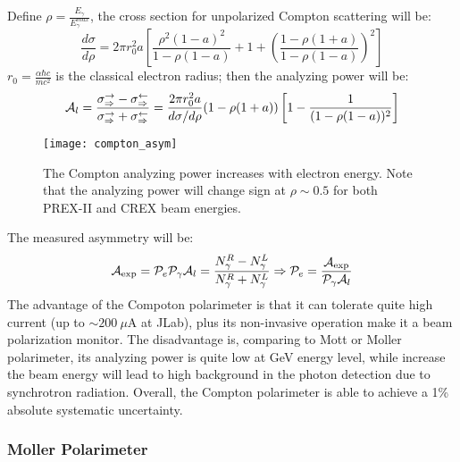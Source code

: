 Define $\rho = \frac{E_\gamma}{E_\gamma^{max}}$, the cross section for unpolarized
Compton scattering will be:
\begin{equation}
    \frac{d\sigma}{d\rho} = 2\pi r_0^2 a 
    \left[ \frac{\rho^2 (1-a)^2}{1 - \rho(1-a)} + 1 + \left( \frac{1 - \rho(1+a)}{1- \rho(1-a)}\right)^2\right]
\end{equation}
$r_0 = \frac{\alpha \hbar c}{mc^2}$ is the classical electron radius; then the
analyzing power will be:
\begin{equation}
    \mathcal{A}_l = \frac{\sigma^\rightarrow_\Rightarrow - \sigma^\leftarrow_\Rightarrow}
    {\sigma^\rightarrow_\Rightarrow + \sigma^\leftarrow_\Rightarrow}
    = \frac{2\pi r_0^2 a}{d\sigma/d\rho}(1 - \rho(1+a))\left[ 1 - \frac{1}{(1 - \rho(1-a))^2}\right]
\end{equation}
\begin{figure}
    \centering
    \texttt{[image: compton\_asym]}
    \caption{The Compton analyzing power increases with electron energy. Note
    that the analyzing power will change sign at $\rho \sim 0.5$ for both PREX-II
    and CREX beam energies.}
\end{figure}

The measured asymmetry will be:
\begin{equation*}
    \mathcal{A}_{\text{exp}} = \mathcal{P}_{e}\mathcal{P}_{\gamma}\mathcal{A}_{l} = \frac{N_{\gamma}^R - N_{\gamma}^L}{N_{\gamma}^R + N_{\gamma}^L}
    \Rightarrow
    \mathcal{P}_e = \frac{\mathcal{A}_{\text{exp}}}{\mathcal{P}_{\gamma}\mathcal{A}_{l}}
\end{equation*}
The advantage of the Compoton polarimeter is that it can tolerate quite high current
(up to $\sim 200 \ \mu$A at JLab), plus its non-invasive operation make it a beam 
polarization monitor. The disadvantage is, comparing to Mott or Moller polarimeter,
its analyzing power is quite low at GeV energy level, while increase the beam
energy will lead to high background in the photon detection due to synchrotron 
radiation. Overall, the Compton polarimeter is able to achieve a 1\% absolute systematic
uncertainty.

\subsubsection{Moller Polarimeter}
\begin{comment}
low current only
\end{comment}

